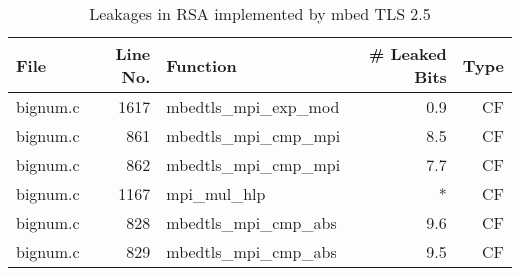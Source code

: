 \begin{table}[h!]
\centering\tiny\scriptsize
\caption{Leakages in RSA implemented by mbed TLS 2.5}\label{tab:RSAmbed TLS2.5}
\begin{tabular}{lrlrr}
\hline
\textbf{File} & \textbf{Line No.} & \textbf{Function} & \textbf{\# Leaked Bits} & \textbf{Type} \\\hline
bignum.c& 1617&mbedtls\_mpi\_exp\_mod&0.9 &CF\\
bignum.c& 861&mbedtls\_mpi\_cmp\_mpi&8.5 &CF\\
bignum.c& 862&mbedtls\_mpi\_cmp\_mpi&7.7 &CF\\
bignum.c& 1167&mpi\_mul\_hlp&*&CF\\
bignum.c& 828&mbedtls\_mpi\_cmp\_abs&9.6 &CF\\
bignum.c& 829&mbedtls\_mpi\_cmp\_abs&9.5 &CF\\
\hline
\end{tabular}
\renewcommand{\baselinestretch}{1.0}\selectfont
\end{table}
